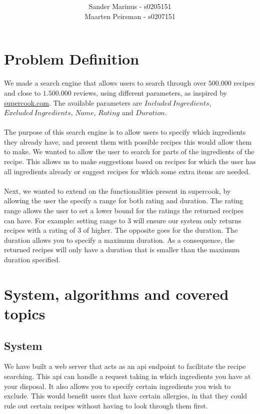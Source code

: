 \documentclass{article}
\title{\textbf{\documentTitle}}
\author{Sander Marinus - s0205151\\Maarten Peirsman - s0207151}
\begin{document}
\maketitle

\section{Problem Definition}
We made a search engine that allows users to search through over $500.000$
recipes and close to $1.500.000$ reviews, using different parameters, as
inspired by \href{https://supercook.com}{supercook.com}.
The available parameters are $Included\ Ingredients$,
$Excluded\ Ingredients$, $Name$, $Rating$ and $Duration$.\\~\\
The purpose of this search engine is to allow users to specify which
ingredients they already have, and present them with possible recipes this
would allow them to make.
We wanted to allow the user to search for parts of the ingredients of the recipe.
This allows us to make suggestions based on recipes for which the user has all
ingredients already or suggest recipes for which some extra items are needed.
\\~\\
Next, we wanted to extend on the functionalities present in supercook, by
allowing the user the specify a range for both rating and duration.
The rating range allows the user to set a lower bound for the ratings the
returned recipes can have. For example: setting range to 3 will ensure our
system only returns recipes with a rating of 3 of higher.
The opposite goes for the duration. The duration allows you to specify a maximum
duration. As a consequence, the returned recipes will only have a duration that is
smaller than the maximum duration specified.

\section{System, algorithms and covered topics}
\subsection{System}
We have built a web server that acts as an api endpoint to facilitate
the recipe searching. This api can handle a request taking in which
ingredients you have at your disposal.
It also allows you to specify certain ingredients you wish to exclude.
This would benefit users that have certain allergies, in that they could
rule out certain recipes without having to look through them first.
\end{document}
